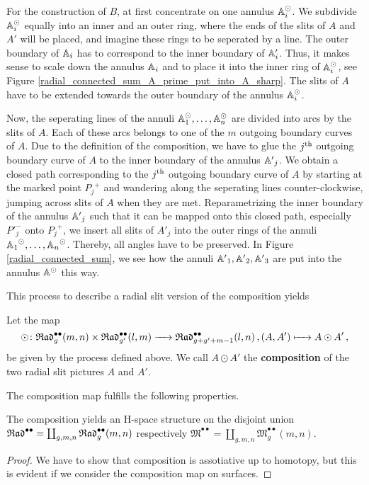 For the construction of $B$, at first concentrate on one annulus $\mathbb A^\odot_i$.
We subdivide $\mathbb A^\odot_i$ equally into an inner and an outer ring, where the ends of the slits of $A$ and $A'$ will be placed, and imagine these rings to be seperated by a line.
The outer boundary of $\mathbb A_i$ has to correspond to the inner boundary of $\mathbb A'_i$.
Thus, it makes sense to scale down the annulus $\mathbb A_i$ and to place it into the inner ring of $\mathbb A^\odot_i$, see Figure \ref{radial_connected_sum_A_prime_put_into_A_sharp}.
The slits of $A$ have to be extended towards the outer boundary of the annulus $\mathbb A^\odot_i$.

Now, the seperating lines of the annuli $\mathbb A_1^\odot, \dotsc, \mathbb A_n^\odot$ are divided into arcs by the slits of $A$.
Each of these arcs belongs to one of the $m$ outgoing boundary curves of $A$.
Due to the definition of the composition, we have to glue the $j^{\text{th}}$ outgoing boundary curve of $A$ to the inner boundary of the annulus ${\mathbb A'}_j$.
We obtain a closed path corresponding to the $j^{\text{th}}$ outgoing boundary curve of $A$ by starting at the marked point ${P_j}^+$ and wandering along the seperating lines counter-clockwise,
jumping across slits of $A$ when they are met.
Reparametrizing the inner boundary of the annulus ${\mathbb A'}_j$ such that it can be mapped onto this closed path, especially ${P'}^-_j$ onto ${P_j}^+$,
we insert all slits of ${A'}_j$ into the outer rings of the annuli ${\mathbb A_1}^\odot, \dotsc, {\mathbb A_n}^\odot$.
Thereby, all angles have to be preserved.
In Figure \ref{radial_connected_sum}, we see how the annuli ${\mathbb A'}_1, {\mathbb A'}_2, {\mathbb A'}_3$ are put into the annulus $\mathbb A^\odot$ this way. 

This process to describe a radial slit version of the composition yields 

\begin{defi}
\label{radial_connected_sum_defi_on_cells}
   Let the map
   \[
      \odot \colon \mathfrak{Rad}^{\bullet \bullet}_g(m, n) \times \mathfrak{Rad}^{\bullet \bullet}_{g'}(l, m) \xrightarrow{\hspace{6pt}{}\hspace{6pt}} \mathfrak{Rad}^{\bullet \bullet}_{g + g' + m - 1}(l, n)\,, (A, A') \xmapsto{\hspace{6pt}{}\hspace{6pt}} A \odot A'\,,
   \]
   be given by the process defined above. 
   We call $A \odot A'$ the \textbf{composition} of the two radial slit pictures $A$ and $A'$.
\end{defi}

The composition map fulfills the following properties.

\begin{prop}
\label{composition_associative}
   The composition yields an H-space structure on the disjoint union $\mathfrak{Rad}^{\bullet \bullet} = \coprod_{g, m, n} \mathfrak{Rad}^{\bullet \bullet}_g(m, n)$ respectively $\mathfrak M^{\bullet \bullet} =\coprod_{g, m, n} \mathfrak M^{\bullet \bullet}_g(m, n)$.
   \begin{proof}
      We have to show that composition is assotiative up to homotopy, but this is evident if we consider the composition map on surfaces.
   \end{proof}
\end{prop}

